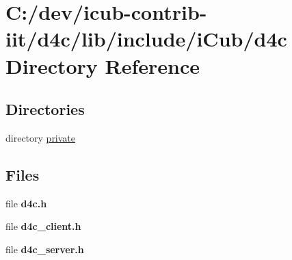 \section{C\+:/dev/icub-\/contrib-\/iit/d4c/lib/include/i\+Cub/d4c Directory Reference}
\label{dir_dd932bb12c37a7efe8dbdca8fd16f2ba}
\subsection*{Directories}
\begin{DoxyCompactItemize}
\item 
directory \hyperlink{dir_09e2a23e449987cffac722db893737cc}{private}
\end{DoxyCompactItemize}
\subsection*{Files}
\begin{DoxyCompactItemize}
\item 
file {\bfseries d4c.\+h}
\item 
file {\bfseries d4c\+\_\+client.\+h}
\item 
file {\bfseries d4c\+\_\+server.\+h}
\end{DoxyCompactItemize}

